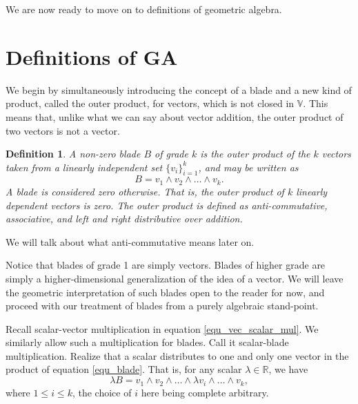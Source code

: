 \documentclass[12pt]{article}
\newcommand{\V}{\mathbb{V}}
\newcommand{\R}{\mathbb{R}}
\newtheorem{definition}{Definition}[section]
\begin{document}
We are now ready to move on to definitions of geometric algebra.

\section{Definitions of GA}

We begin by simultaneously introducing the concept of a blade and a new kind of
product, called the outer product, for vectors, which is not closed in $\V$.  This means
that, unlike what we can say about vector addition, the outer product of two vectors is not a vector.
\begin{definition}\label{def_blade}
A non-zero blade $B$ of grade $k$ is the outer product of the $k$ vectors taken
from a linearly independent set $\{v_i\}_{i=1}^k$, and may be written as
\begin{equation}\label{equ_blade}
B = v_1\wedge v_2\wedge\dots\wedge v_k.
\end{equation}
A blade is considered zero otherwise.  That is, the outer product of $k$
linearly dependent vectors is zero.  The outer product is defined as
anti-commutative, associative, and left and right distributive over addition.
\end{definition}

We will talk about what anti-commutative means later on.

Notice that blades of grade 1 are simply vectors.  Blades of higher grade are simply
a higher-dimensional generalization of the idea of a vector.  We will leave the geometric
interpretation of such blades open to the reader for now, and proceed with our treatment of
blades from a purely algebraic stand-point.

Recall scalar-vector multiplication in equation \eqref{equ_vec_scalar_mul}.
We similarly allow such a multiplication for blades.  Call it scalar-blade multiplication.
Realize that a scalar distributes to one and only one vector in the product of
equation \eqref{equ_blade}.  That is, for any scalar $\lambda\in\R$,
we have
\begin{equation}
\lambda B = v_1\wedge v_2\wedge\dots\wedge \lambda v_i\wedge\dots\wedge v_k,
\end{equation}
where $1\leq i\leq k$, the choice of $i$ here being complete arbitrary.
\end{document}
